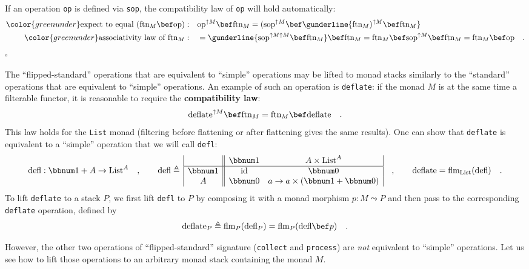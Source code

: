 If an operation \lstinline!op! is defined via \lstinline!sop!, the
compatibility law of \lstinline!op! will hold automatically:
\begin{align*}
{\color{greenunder}\text{expect to equal }(\text{ftn}_{M}\bef\text{op}):}\quad & \text{op}^{\uparrow M}\bef\text{ftn}_{M}=(\text{sop}^{\uparrow M}\bef\gunderline{\text{ftn}_{M})^{\uparrow M}\bef\text{ftn}_{M}}\\
{\color{greenunder}\text{associativity law of }\text{ftn}_{M}:}\quad & =\gunderline{\text{sop}^{\uparrow M\uparrow M}\bef\text{ftn}_{M}}\bef\text{ftn}_{M}=\text{ftn}_{M}\bef\text{sop}^{\uparrow M}\bef\text{ftn}_{M}=\text{ftn}_{M}\bef\text{op}\quad.
\end{align*}
$\square$

The \textsf{``}flipped-standard\textsf{''} operations that are equivalent to \textsf{``}simple\textsf{''}
operations may be lifted to monad stacks similarly to the \textsf{``}standard\textsf{''}
operations that are equivalent to \textsf{``}simple\textsf{''} operations. An example
of such an operation is \lstinline!deflate!: if the monad $M$ is
at the same time a filterable functor, it is reasonable to require
the \textbf{compatibility
law}:
\[
\text{deflate}^{\uparrow M}\bef\text{ftn}_{M}=\text{ftn}_{M}\bef\text{deflate}\quad.
\]
This law holds for the \lstinline!List! monad (filtering before flattening
or after flattening gives the same results). One can show that \lstinline!deflate!
is equivalent to a \textsf{``}simple\textsf{''} operation that we will call \lstinline!defl!:
\[
\text{defl}:\bbnum 1+A\rightarrow\text{List}^{A}\quad,\quad\quad\text{defl}\triangleq\,\begin{array}{|c||cc|}
 & \bbnum 1 & A\times\text{List}^{A}\\
\hline \bbnum 1 & \text{id} & \bbnum 0\\
A & \bbnum 0 & a\rightarrow a\times(\bbnum 1+\bbnum 0)
\end{array}\quad,\quad\quad\text{deflate}=\text{flm}_{\text{List}}(\text{defl})\quad.
\]
To lift \lstinline!deflate! to a stack $P$, we first lift \lstinline!defl!
to $P$ by composing it with a monad morphism $p:M\leadsto P$ and
then pass to the corresponding \lstinline!deflate! operation, defined
by
\[
\text{deflate}_{P}\triangleq\text{flm}_{P}(\text{defl}_{P})=\text{flm}_{P}(\text{defl}\bef p)\quad.
\]

However, the other two operations of \textsf{``}flipped-standard\textsf{''} signature
(\lstinline!collect! and \lstinline!process!) are \emph{not} equivalent
to \textsf{``}simple\textsf{''} operations. Let us see how to lift those operations
to an arbitrary monad stack containing the monad $M$.

